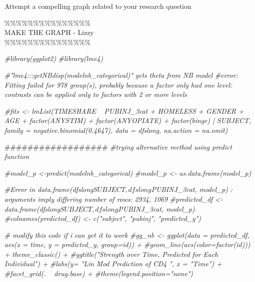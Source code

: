 \documentclass[ignorenonframetext,]{beamer}
\newenvironment{Shaded}{\begin{snugshade}}{\end{snugshade}}
\newcommand{\CommentTok}[1]{\textcolor[rgb]{0.56,0.35,0.01}{\textit{#1}}}
\newcommand{\NormalTok}[1]{#1}
\begin{document}
\begin{frame}[fragile]{Attempt a compelling graph related to your
research question}

\%\%\%\%\%\%\%\%\%\%\%\%\%\%\%\\
MAKE THE GRAPH - Lizzy\\
\%\%\%\%\%\%\%\%\%\%\%\%\%\%\%

\begin{Shaded}
\begin{Highlighting}[]
\CommentTok{#library(ggplot2)}
\CommentTok{#library(lme4)}

\CommentTok{#"lme4:::getNBdisp(modelnb_categorical)" gets theta from NB model}
\CommentTok{#error: Fitting failed for 978 group(s), probably because a factor only had one level: contrasts can be applied only to factors with 2 or more levels}

\CommentTok{#fits <- lmList(TIMESHARE ~ PUBINJ_3cat + HOMELESS + GENDER + AGE + factor(ANYSTIM) + factor(ANYOPIATE) + factor(binge) | SUBJECT, family = negative.binomial(0.4647), data = dfslong, na.action = na.omit)}


\NormalTok{##################}
\CommentTok{#trying alternative method using predict function}

\CommentTok{#model_p <-predict(modelnb_categorical)}
\CommentTok{#model_p <- as.data.frame(model_p)}

\CommentTok{#Error in data.frame(dfslong$SUBJECT, dfslong$PUBINJ_3cat, model_p) : arguments imply differing number of rows: 2934, 1069}
\CommentTok{#predicted_df <- data.frame(dfslong$SUBJECT, dfslong$PUBINJ_3cat, model_p)}
\CommentTok{#colnames(predicted_df) <- c("subject", "pubinj", "predicted_y")}

\CommentTok{# modify this code if i can get it to work}
\CommentTok{#gg_nb <- ggplot(data = predicted_df, aes(x = time, y = predicted_y, group=id)) +}
  \CommentTok{#geom_line(aes(color=factor(id))) + theme_classic() +}
  \CommentTok{#ggtitle("Strength over Time, Predicted for Each Individual") +}
  \CommentTok{#labs(y= "Lin Mod Prediction of CD4 ", x = "Time") +}
  \CommentTok{#facet_grid(. ~ drug.base) +}
  \CommentTok{#theme(legend.position="none")}
\end{Highlighting}
\end{Shaded}

\end{frame}
\end{document}
